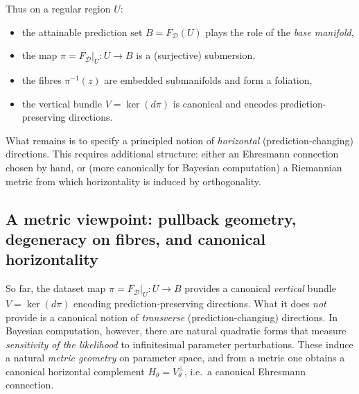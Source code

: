 
Thus on a regular region $U$:
\begin{itemize}
\item the attainable prediction set $B=F_{\mathcal D}(U)$ plays the role of the \emph{base manifold},
\item the map $\pi=F_{\mathcal D}|_U:U\to B$ is a (surjective) submersion,
\item the fibres $\pi^{-1}(z)$ are embedded submanifolds and form a foliation,
\item the vertical bundle $V=\ker(d\pi)$ is canonical and encodes prediction-preserving directions.
\end{itemize}
What remains is to specify a principled notion of \emph{horizontal} (prediction-changing) directions.
This requires additional structure: either an Ehresmann connection chosen by hand,
or (more canonically for Bayesian computation) a Riemannian metric from which horizontality is
induced by orthogonality.

\subsection{A metric viewpoint: pullback geometry, degeneracy on fibres, and canonical horizontality}
\label{subsec:metric_pullback_canonical_horizontal}

So far, the dataset map $\pi=F_{\mathcal D}|_U:U\to B$ provides a canonical \emph{vertical}
bundle $V=\ker(d\pi)$ encoding prediction-preserving directions.
What it does \emph{not} provide is a canonical notion of \emph{transverse} (prediction-changing)
directions.  In Bayesian computation, however, there are natural quadratic forms that measure
\emph{sensitivity of the likelihood} to infinitesimal parameter perturbations.  These induce
a natural \emph{metric geometry} on parameter space, and from a metric one obtains a canonical
horizontal complement $H_\theta = V_\theta^{\perp}$, i.e.\ a canonical Ehresmann connection.

